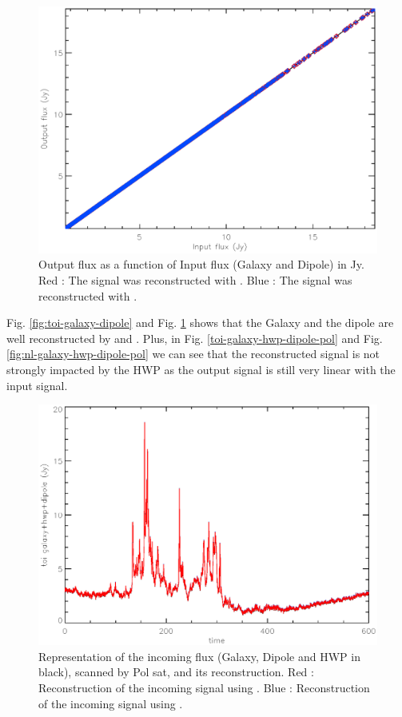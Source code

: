 \begin{figure}[h]
\center
	\includegraphics[scale=0.5]{Figures/NL-galaxy-dipole.eps}
	\caption{Output flux as a function of Input flux (Galaxy and Dipole) in Jy. Red : The signal was reconstructed with \cf. Blue : The signal was reconstructed with \rf.}
	\label{fig:nl-galaxy-dipole-pol}
\end{figure}

Fig. \ref{fig:toi-galaxy-dipole} and  Fig. \ref{fig:nl-galaxy-dipole-pol} shows that the Galaxy and the dipole are well reconstructed by \rf and \cf. Plus, in Fig. \ref{toi-galaxy-hwp-dipole-pol} and Fig. \ref{fig:nl-galaxy-hwp-dipole-pol} we can see that the reconstructed signal is not strongly impacted by the HWP as the output signal is still very linear with the input signal.

\begin{figure}[h]
\center
	\includegraphics[scale=0.5]{Figures/toi-galaxy-hwp-dipole.eps}
	\caption{Representation of the incoming flux (Galaxy, Dipole and HWP in black), scanned by Pol sat, and its reconstruction. Red : Reconstruction of the incoming signal using \cf. Blue : Reconstruction of the incoming signal using \rf. }
	\label{fig:toi-galaxy-hwp-dipole-pol}
\end{figure}

